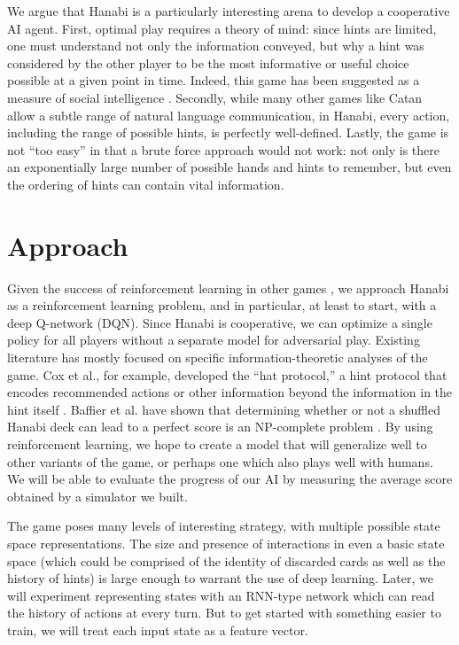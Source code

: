 \documentclass{article}
\begin{document}
We argue that Hanabi is a particularly interesting arena to develop a cooperative AI agent. First, optimal play requires a theory of mind: since hints are limited, one must understand not only the information conveyed, but why a hint was considered by the other player to be the most informative or useful choice possible at a given point in time. Indeed, this game has been suggested as a measure of social intelligence \cite{osawa15}. Secondly, while many other games like Catan allow a subtle range of natural language communication, in Hanabi, every action, including the range of possible hints, is perfectly well-defined. Lastly, the game is not ``too easy'' in that a brute force approach would not work: not only is there an exponentially large number of possible hands and hints to remember, but even the ordering of hints can contain vital information.


\section{Approach}

Given the success of reinforcement learning in other games \cite{mnih15, silver17}, we approach Hanabi as a reinforcement learning problem, and in particular, at least to start, with a deep Q-network (DQN). Since Hanabi is cooperative, we can optimize a single policy for all players without a separate model for adversarial play. Existing literature has mostly focused on specific information-theoretic analyses of the game. Cox et al., for example, developed the “hat protocol,” a hint protocol that encodes recommended actions or other information beyond the information in the hint itself \cite{cox15}. Baffier et al. have shown that determining whether or not a shuffled Hanabi deck can lead to a perfect score is an NP-complete problem \cite{baffier16}. By using reinforcement learning, we hope to create a model that will generalize well to other variants of the game, or perhaps one which also plays well with humans. We will be able to evaluate the progress of our AI by measuring the average score obtained by a simulator we built.

The game poses many levels of interesting strategy, with multiple possible state space representations. The size and presence of interactions in even a basic state space (which could be comprised of the identity of discarded cards as well as the history of hints) is large enough to warrant the use of deep learning. Later, we will experiment representing states with an RNN-type network which can read the history of actions at every turn. But to get started with something easier to train, we will treat each input state as a feature vector.
\end{document}
